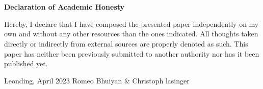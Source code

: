 \thispagestyle{empty}
\vspace{3cm}
~ \\ \\
\textbf{Declaration of Academic Honesty}

Hereby, I declare that I have composed the presented paper independently on my own
and without any other resources than the ones indicated. All thoughts taken directly or
indirectly from external sources are properly denoted as such.
This paper has neither been previously submitted to another authority nor has it
been published yet.
\vspace{3cm}
\begin{tabbing}
Leonding, April 2023 \hspace{5cm} Romeo Bhuiyan \& Christoph lasinger
\end{tabbing}
\vspace{10cm}
\newpage
\setcounter{page}{1}
